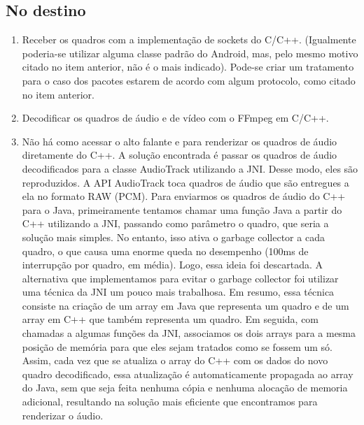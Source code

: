 \documentclass{acm_proc_article-sp}
\begin{document}
\subsection{No destino}
\begin{enumerate}
 \item Receber os quadros com a implementação de sockets do C/C++. (Igualmente poderia-se utilizar alguma classe padrão do Android, mas, pelo mesmo motivo citado no item anterior, não é o mais indicado). Pode-se criar um tratamento para o caso dos pacotes estarem de acordo com algum protocolo, como citado no item anterior.
 \item Decodificar os quadros de áudio e de vídeo com o FFmpeg em C/C++.
 \item Não há como acessar o alto falante e para renderizar os quadros de áudio diretamente do C++. A solução encontrada é passar os quadros de áudio decodificados para a classe AudioTrack utilizando a JNI. Desse modo, eles são reproduzidos. A API AudioTrack toca quadros de áudio que são entregues a ela no formato RAW (PCM). Para enviarmos os quadros de áudio do C++ para o Java, primeiramente tentamos chamar uma função Java a partir do C++ utilizando a JNI, passando como parâmetro o quadro, que seria a solução mais simples. No entanto, isso ativa o garbage collector a cada quadro, o que causa uma enorme queda no desempenho (100ms de interrupção por quadro, em média). Logo, essa ideia foi descartada. A alternativa que implementamos para evitar o garbage collector foi utilizar uma técnica da JNI um pouco mais trabalhosa. Em resumo, essa técnica consiste na criação de um array em Java que representa um quadro e de um array em C++ que também representa um quadro. Em seguida, com chamadas a algumas funções da JNI, associamos os dois arrays para a mesma posição de memória para que eles sejam tratados como se fossem um só. Assim, cada vez que se atualiza o array do C++ com os dados do novo quadro decodificado, essa atualização é automaticamente propagada ao array do Java, sem que seja feita nenhuma cópia e nenhuma alocação de memoria adicional, resultando na solução mais eficiente que encontramos para renderizar o áudio.

\end{enumerate}
\end{document}
